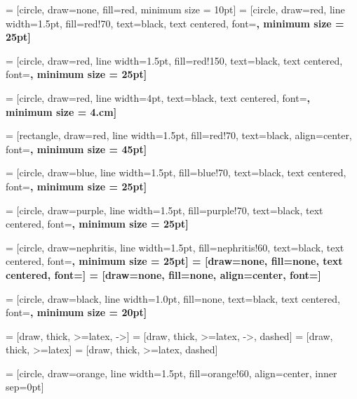 
 = [circle, draw=none, fill=red, minimum size = 10pt]
 = [circle, draw=red, line width=1.5pt, fill=red!70, text=black, text centered, font=\bf \normalsize, minimum size = 25pt]

 = [circle, draw=red, line width=1.5pt, fill=red!150, text=black, text centered, font=\bf \normalsize, minimum size = 25pt]


 = [circle, draw=red, line width=4pt, text=black, text centered, font=\bf \normalsize, minimum size = 4.cm]

 = [rectangle, draw=red, line width=1.5pt, fill=red!70, text=black, align=center, font=\bf \normalsize, minimum size = 45pt]

 = [circle, draw=blue, line width=1.5pt, fill=blue!70, text=black, text centered, font=\bf \normalsize, minimum size = 25pt]

 = [circle, draw=purple, line width=1.5pt, fill=purple!70, text=black, text centered, font=\bf \normalsize, minimum size = 25pt]


 = [circle, draw=nephritis, line width=1.5pt, fill=nephritis!60, text=black, text centered, font=\bf \normalsize, minimum size = 25pt]
 = [draw=none, fill=none, text centered, font=\bf \normalsize]
 = [draw=none, fill=none, align=center, font=\bf \normalsize]

 = [circle, draw=black, line width=1.0pt, fill=none, text=black, text centered, font=\bf \normalsize, minimum size = 20pt]


  = [draw, thick, >=latex, ->]
  = [draw, thick, >=latex, ->, dashed]
  = [draw, thick, >=latex]
  = [draw, thick, >=latex, dashed]


 = [circle, draw=orange, line width=1.5pt, fill=orange!60, align=center, inner sep=0pt]